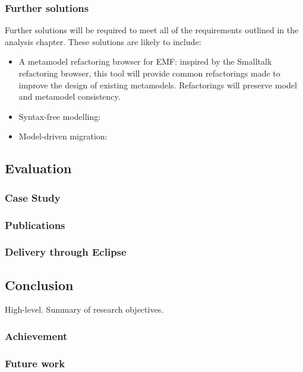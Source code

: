 \subsubsection{Further solutions}
Further solutions will be required to meet all of the requirements outlined in the analysis chapter. These solutions are likely to include:

\begin{itemize}
	\item A metamodel refactoring browser for EMF: inspired by the Smalltalk refactoring browser, this tool will provide common refactorings made to improve the design of existing metamodels. Refactorings will preserve model and metamodel consistency.
	\item Syntax-free modelling:
	\item Model-driven migration:
\end{itemize}


\subsection{Evaluation}
\subsubsection{Case Study}
\subsubsection{Publications}
\subsubsection{Delivery through Eclipse}

\subsection{Conclusion}
High-level. Summary of research objectives.

\subsubsection{Achievement}
\subsubsection{Future work}